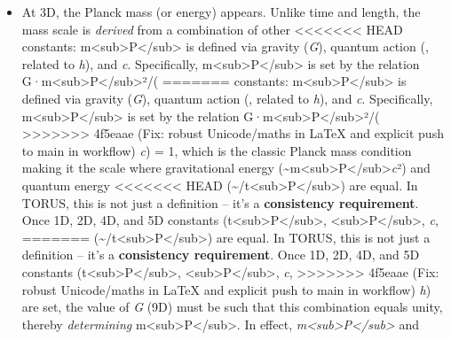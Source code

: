 \documentclass[]{article}
\begin{document}
{\begin{itemize}
  guarantee that the emergence of 1D time and 2D space yields a
>>>>>>> 4f5eaae (Fix: robust Unicode/maths in LaTeX and explicit push to main in workflow)
  consistent space-time pair. In other words, \emph{c} (4D) acts as a
  conversion factor ensuring the 1D and 2D anchors are mutually
  compatible -- a foundational check that the recursion's base is solid.
\item
  At 3D, the Planck mass (or energy) appears. Unlike time and length,
  the mass scale is \emph{derived} from a combination of other
<<<<<<< HEAD
  constants: m\textless sub\textgreater P\textless/sub\textgreater{} is
  defined via gravity (\emph{G}), quantum action (\emph{\hbar}, related to
  \emph{h}), and \emph{c}. Specifically,
  m\textless sub\textgreater P\textless/sub\textgreater{} is set by the
  relation
  G·m\textless sub\textgreater P\textless/sub\textgreater²/(\emph{\hbar}
=======
  constants: m\textless{}sub\textgreater{}P\textless{}/sub\textgreater{}
  is defined via gravity (\emph{G}), quantum action (\emph{\hbar}, related
  to \emph{h}), and \emph{c}. Specifically,
  m\textless{}sub\textgreater{}P\textless{}/sub\textgreater{} is set by
  the relation
  G·m\textless{}sub\textgreater{}P\textless{}/sub\textgreater{}²/(\emph{\hbar}
>>>>>>> 4f5eaae (Fix: robust Unicode/maths in LaTeX and explicit push to main in workflow)
  \emph{c}) = 1, which is the classic Planck mass condition making it
  the scale where gravitational energy
  (\textasciitilde{}m\textless{}sub\textgreater{}P\textless{}/sub\textgreater{}\emph{c}²)
  and quantum energy
<<<<<<< HEAD
  (\textasciitilde \hbar/t\textless sub\textgreater P\textless/sub\textgreater)
  are equal. In TORUS, this is not just a definition -- it's a
  \textbf{consistency requirement}. Once 1D, 2D, 4D, and 5D constants
  (t\textless sub\textgreater P\textless/sub\textgreater,
  \ell\textless sub\textgreater P\textless/sub\textgreater, \emph{c},
=======
  (\textasciitilde{}\hbar/t\textless{}sub\textgreater{}P\textless{}/sub\textgreater{})
  are equal. In TORUS, this is not just a definition -- it's a
  \textbf{consistency requirement}. Once 1D, 2D, 4D, and 5D constants
  (t\textless{}sub\textgreater{}P\textless{}/sub\textgreater{},
  \ell\textless{}sub\textgreater{}P\textless{}/sub\textgreater{}, \emph{c},
>>>>>>> 4f5eaae (Fix: robust Unicode/maths in LaTeX and explicit push to main in workflow)
  \emph{h}) are set, the value of \emph{G} (9D) must be such that this
  combination equals unity​, thereby \emph{determining}
  m\textless{}sub\textgreater{}P\textless{}/sub\textgreater{}. In
  effect,
  \emph{m\textless{}sub\textgreater{}P\textless{}/sub\textgreater{}} and

\end{itemize}}
\end{document}
